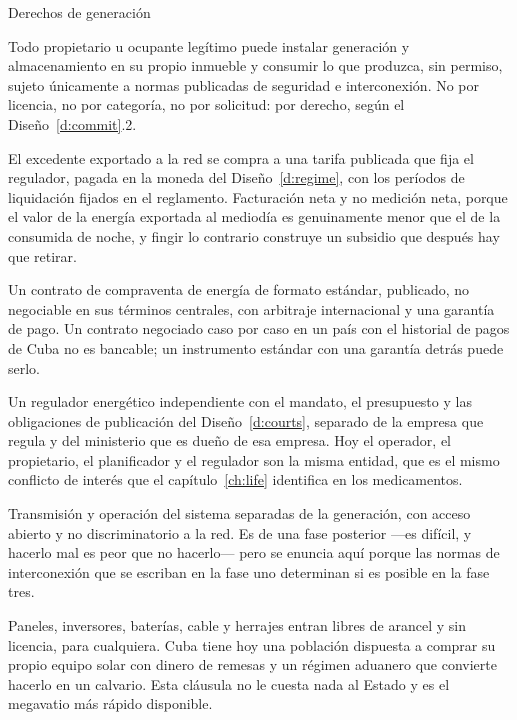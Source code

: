 \begin{design}{Derechos de generación}
\label{d:genrights}
\begin{rules}
 Todo propietario u ocupante legítimo puede instalar generación
y almacenamiento en su propio inmueble y consumir lo que produzca, sin permiso, sujeto
únicamente a normas publicadas de seguridad e interconexión. No por licencia, no por
categoría, no por solicitud: por derecho, según el Diseño~\ref{d:commit}.2.

 El excedente exportado a la red se compra a una tarifa publicada
que fija el regulador, pagada en la moneda del Diseño~\ref{d:regime}, con los períodos de
liquidación fijados en el reglamento. Facturación neta y no medición neta, porque el
valor de la energía exportada al mediodía es genuinamente menor que el de la consumida de
noche, y fingir lo contrario construye un subsidio que después hay que retirar.

 Un contrato de compraventa de energía de formato
estándar, publicado, no negociable en sus términos centrales, con arbitraje internacional
y una garantía de pago. Un contrato negociado caso por caso en un país con el historial
de pagos de Cuba no es bancable; un instrumento estándar con una garantía detrás puede
serlo.

 Un regulador energético independiente con el mandato, el presupuesto y
las obligaciones de publicación del Diseño~\ref{d:courts}, separado de la empresa que
regula y del ministerio que es dueño de esa empresa. Hoy el operador, el propietario, el
planificador y el regulador son la misma entidad, que es el mismo conflicto de interés
que el capítulo~\ref{ch:life} identifica en los medicamentos.

 Transmisión y operación del sistema separadas de la
generación, con acceso abierto y no discriminatorio a la red. Es de una fase posterior
---es difícil, y hacerlo mal es peor que no hacerlo--- pero se enuncia aquí porque las
normas de interconexión que se escriban en la fase uno determinan si es posible en la
fase tres.

 Paneles, inversores, baterías, cable y herrajes entran
libres de arancel y sin licencia, para cualquiera. Cuba tiene hoy una población dispuesta
a comprar su propio equipo solar con dinero de remesas y un régimen aduanero que convierte
hacerlo en un calvario. Esta cláusula no le cuesta nada al Estado y es el megavatio más
rápido disponible.
\end{rules}
\end{design}

